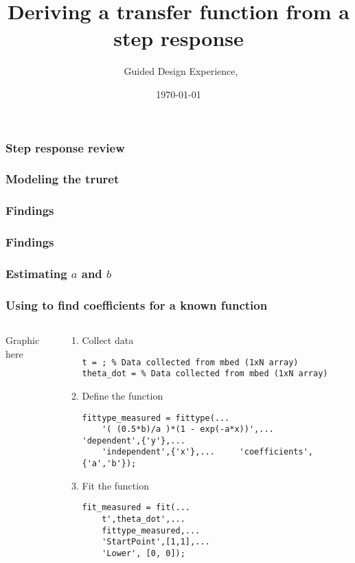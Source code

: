 \documentclass[aspectratio=169]{beamer}
\title{Deriving a transfer function from a step response}
\subtitle{\usnaCourseNumber\ Guided Design Experience, \usnaCourseTerm}
\author{\usnaInstructorShort}
\date{\today}
\begin{document}
\settitlebg
\begin{frame}
\titlepage
\end{frame}

\setslidebg
\begin{frame}
\frametitle{Step response review}
\end{frame}

\begin{frame}
\frametitle{Modeling the truret}
\end{frame}

\begin{frame}
\frametitle{Findings}
\end{frame}

\begin{frame}
\frametitle{Findings}
\end{frame}

\begin{frame}
\frametitle{Estimating $a$ and $b$}
\end{frame}

\begin{frame}
\frametitle{Using \Matlab to find coefficients for a known function}
\begin{columns}
\begin{column}{0.5\textwidth}
Graphic here
\end{column}
\begin{column}{0.5\textwidth}
\begin{enumerate}
\item Collect data
\begin{lstlisting}[style=usnaMatlab]
t = ; % Data collected from mbed (1xN array)
theta_dot = % Data collected from mbed (1xN array)
\end{lstlisting}
\item Define the function
\begin{lstlisting}[style=usnaMatlab]
fittype_measured = fittype(...
	'( (0.5*b)/a )*(1 - exp(-a*x))',... 	'dependent',{'y'},... 
	'independent',{'x'},... 	'coefficients',{'a','b'});
\end{lstlisting}
\item Fit the function
\begin{lstlisting}[style=usnaMatlab]
fit_measured = fit(...
	t',theta_dot',...
	fittype_measured,...
	'StartPoint',[1,1],...
	'Lower', [0, 0]);
\end{lstlisting}
\end{enumerate}
\end{column}
\end{columns}
\end{frame}
\end{document}
